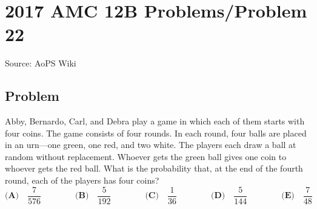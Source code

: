 \documentclass[12pt]{article}
\begin{document}
\section*{{2017 AMC 12B Problems/Problem 22}}
Source: AoPS Wiki

\subsection*{Problem}
Abby, Bernardo, Carl, and Debra play a game in which each of them starts with four coins. The game consists of four rounds. In each round, four balls are placed in an urn---one green, one red, and two white. The players each draw a ball at random without replacement. Whoever gets the green ball gives one coin to whoever gets the red ball. What is the probability that, at the end of the fourth round, each of the players has four coins? $\textbf{(A)}\quad \dfrac{7}{576} \qquad \qquad \textbf{(B)}\quad \dfrac{5}{192} \qquad\qquad \textbf{(C)}\quad \dfrac{1}{36} \qquad\qquad \textbf{(D)}\quad \dfrac{5}{144} \qquad\qquad\textbf{(E)}\quad \dfrac{7}{48}$
\end{document}
